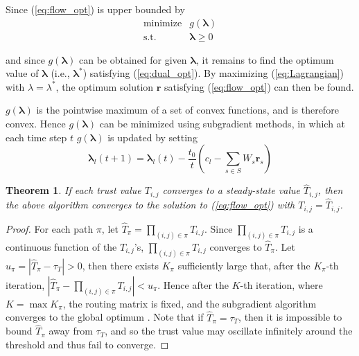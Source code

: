\documentclass[conference]{IEEEtran}
\newtheorem{thm}{Theorem}
\begin{document}
Since (\ref{eq:flow_opt}) is upper bounded by
\begin{equation}
\label{eq:dual_opt}
\begin{array}{cc}
\mbox{minimize} & g(\mathbf{\lambda}) \\
\mbox{s.t.} & \mathbf{\lambda} \geq 0
\end{array}
\end{equation}

and since $g(\mathbf{\lambda})$ can be obtained for given $\mathbf{\lambda}$, it remains to find the optimum value of $\mathbf{\lambda}$ (i.e., $\mathbf{\lambda}^{\ast}$) satisfying (\ref{eq:dual_opt}).  By maximizing (\ref{eq:Lagrangian}) with $\lambda = \lambda^{\ast}$, the optimum solution $\mathbf{r}$ satisfying (\ref{eq:flow_opt}) can then be found.

$g(\mathbf{\lambda})$ is the pointwise maximum of a set of convex functions, and is therefore convex.  Hence $g(\mathbf{\lambda})$ can be minimized using subgradient methods, in which at each time step $t$ $g(\mathbf{\lambda})$ is updated by setting
\begin{equation}
\mathbf{\lambda}_{l}(t+1) = \mathbf{\lambda}_{l}(t) - \frac{t_{0}}{t}\left(c_{l} - \sum_{s \in S}{W_{s}\mathbf{r}_{s}}\right)
\end{equation}




\begin{thm}
If each trust value $T_{i,j}$ converges to a steady-state value $\hat{T}_{i,j}$, then the above algorithm converges to the solution to (\ref{eq:flow_opt}) with $T_{i,j} = \hat{T}_{i,j}$.
\end{thm}

\begin{proof}
For each path $\pi$, let $\hat{T}_{\pi} = \prod_{(i,j) \in \pi}{T_{i,j}}$.  Since $\prod_{(i,j) \in \pi}{T_{i,j}}$ is a continuous function of the $T_{i,j}$'s, $\prod_{(i,j) \in \pi}{T_{i,j}}$ converges to $\hat{T}_{\pi}$.  Let $u_{\pi} = |\hat{T}_{\pi} - \tau_{T}| > 0$, then there exists $K_{\pi}$ sufficiently large that, after the $K_{\pi}$-th iteration, $|\hat{T}_{\pi} - \prod_{(i,j) \in \pi}{T_{i,j}}| < u_{\pi}$.  Hence after the $K$-th iteration, where $K = \max{K_{\pi}}$, the routing matrix is fixed, and the subgradient algorithm converges to the global optimum \cite{bertsekas1999nonlinear}.  Note that if $\hat{T}_{\pi} = \tau_{T}$, then it is impossible to bound $\hat{T}_{\pi}$ away from $\tau_{T}$, and so the trust value may oscillate infinitely around the threshold and thus fail to converge.
\end{proof}
\end{document}
